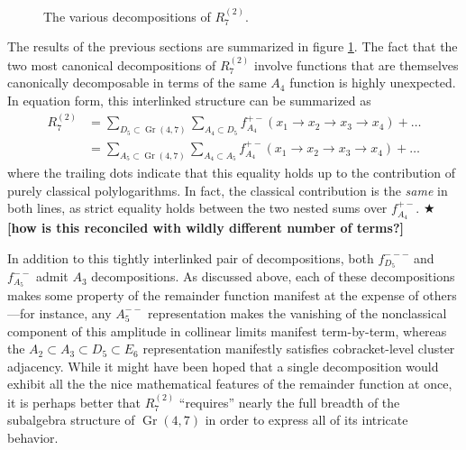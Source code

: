 \documentclass[12pt]{article}
\DeclareMathOperator{\Gr}{Gr}
\def\draftnote#1{{\color{red} $\bigstar$ }{\bf [#1]}}
\begin{document}
\begin{figure}[t] \centering
  \caption{The various decompositions of $R^{(2)}_7$.}
\label{fig:R27_decompositions}
\end{figure}

The results of the previous sections are summarized in figure \ref{fig:R27_decompositions}. The fact that the two most canonical decompositions of $R^{(2)}_7$ involve functions that are themselves canonically decomposable in terms of the same $A_4$ function is highly unexpected. In equation form, this interlinked structure can be summarized as
\begin{align}
	R^{(2)}_7 &= \sum_{D_5\subset \Gr(4,7)} \sum_{A_4\subset D_5} f_{A_4}^{+-}(x_1\to x_2 \to x_3 \to x_4) + \dots \\
	& = \sum_{A_5\subset \Gr(4,7)} \sum_{A_4\subset A_5} f_{A_4}^{+-}(x_1\to x_2 \to x_3 \to x_4) + \dots
\end{align}
where the trailing dots indicate that this equality holds up to the contribution of purely classical polylogarithms. In fact, the classical contribution is the \emph{same} in both lines, as strict equality holds between the two nested sums over $f_{A_4}^{+-}$.\draftnote{how is this reconciled with wildly different number of terms?}

In addition to this tightly interlinked pair of decompositions, both $f_{D_5}^{---}$ and $f_{A_5}^{--}$ admit $A_3$ decompositions. As discussed above, each of these decompositions makes some property of the remainder function manifest at the expense of others---for instance, any $A_5^{--}$ representation makes the vanishing of the nonclassical component of this amplitude in collinear limits manifest term-by-term, whereas the $A_2 \subset A_3 \subset D_5 \subset E_6$ representation manifestly satisfies cobracket-level cluster adjacency. While it might have been hoped that a single decomposition would exhibit all the the nice mathematical features of the remainder function at once, it is perhaps better that $R^{(2)}_7$ ``requires'' nearly the full breadth of the subalgebra structure of $\Gr(4,7)$ in order to express all of its intricate behavior. 
\end{document}
